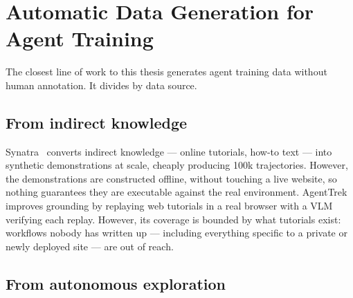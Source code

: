 \section{Automatic Data Generation for Agent Training}
\label{sec:rel-datagen}

The closest line of work to this thesis generates agent training data without
human annotation. It divides by data source.

\subsection{From indirect knowledge}

Synatra~\cite{ou2024synatra} converts indirect knowledge --- online
tutorials, how-to text --- into synthetic demonstrations at scale, cheaply
producing 100k trajectories. However, the demonstrations are constructed
offline, without touching a live website, so nothing guarantees they are
executable against the real environment.
AgentTrek~\cite{xu2024agenttrek} improves grounding by replaying web
tutorials in a real browser with a VLM verifying each replay. However, its
coverage is bounded by what tutorials exist: workflows nobody has written
up --- including everything specific to a private or newly deployed site ---
are out of reach.

\subsection{From autonomous exploration}

